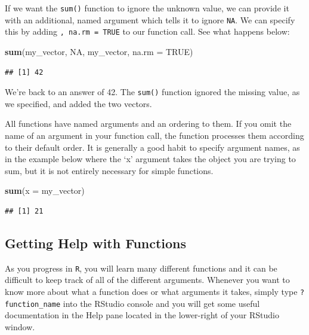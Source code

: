 \documentclass[
]{book}
\newenvironment{Shaded}{\begin{snugshade}}{\end{snugshade}}
\newcommand{\AttributeTok}[1]{\textcolor[rgb]{0.13,0.29,0.53}{#1}}
\newcommand{\ConstantTok}[1]{\textcolor[rgb]{0.56,0.35,0.01}{#1}}
\newcommand{\FunctionTok}[1]{\textcolor[rgb]{0.13,0.29,0.53}{\textbf{#1}}}
\newcommand{\NormalTok}[1]{#1}
\begin{document}
If we want the \texttt{sum()} function to ignore the unknown value, we can provide it with an additional, named argument which tells it to ignore \texttt{NA}. We can specify this by adding \texttt{,\ na.rm\ =\ TRUE} to our function call. See what happens below:

\begin{Shaded}
\begin{Highlighting}[]
\FunctionTok{sum}\NormalTok{(my\_vector, }\ConstantTok{NA}\NormalTok{, my\_vector, }\AttributeTok{na.rm =} \ConstantTok{TRUE}\NormalTok{)}
\end{Highlighting}
\end{Shaded}

\begin{verbatim}
## [1] 42
\end{verbatim}

We're back to an answer of 42. The \texttt{sum()} function ignored the missing value, as we specified, and added the two vectors.

All functions have named arguments and an ordering to them. If you omit the name of an argument in your function call, the function processes them according to their default order. It is generally a good habit to specify argument names, as in the example below where the `x' argument takes the object you are trying to sum, but it is not entirely necessary for simple functions.

\begin{Shaded}
\begin{Highlighting}[]
\FunctionTok{sum}\NormalTok{(}\AttributeTok{x =}\NormalTok{ my\_vector)}
\end{Highlighting}
\end{Shaded}

\begin{verbatim}
## [1] 21
\end{verbatim}

\hypertarget{getting-help-with-functions}{%
\subsection{Getting Help with Functions}\label{getting-help-with-functions}}

As you progress in \texttt{R}, you will learn many different functions and it can be difficult to keep track of all of the different arguments. Whenever you want to know more about what a function does or what arguments it takes, simply type \texttt{?function\_name} into the RStudio console and you will get some useful documentation in the Help pane located in the lower-right of your RStudio window.
\end{document}
